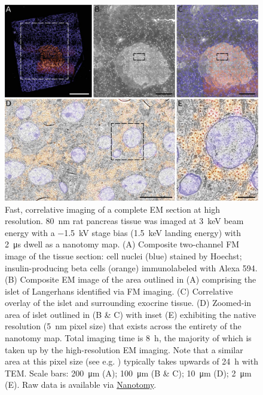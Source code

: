 \begin{figure}[!tb]
    \centering
    \includegraphics[width=\linewidth]{chapter-2/figures_JPEG_HQ/fig2-7_rat.jpg}
    \caption{Fast, correlative imaging of a complete EM section at high resolution. \SI{80}{\nano\meter} rat pancreas tissue was imaged at \SI{3}{\kilo\electronvolt} beam energy with a \SI{-1.5}{\kilo\volt} stage bias (\SI{1.5}{\kilo\electronvolt} landing energy) with \SI{2}{\micro\second} dwell as a nanotomy map. (A) Composite two-channel FM image of the tissue section: cell nuclei (blue) stained by Hoechst; insulin-producing beta cells (orange) immunolabeled with Alexa 594. (B) Composite EM image of the area outlined in (A) comprising the islet of Langerhans identified via FM imaging. (C) Correlative overlay of the islet and surrounding exocrine tissue. (D) Zoomed-in area of islet outlined in (B \& C) with inset (E) exhibiting the native resolution (\SI{5}{\nano\meter} pixel size) that exists across the entirety of the nanotomy map. Total imaging time is \SI{8}{\hour}, the majority of which is taken up by the high-resolution EM imaging. Note that a similar area at this pixel size (see e.g. \textcite{ravelli2013destruction}) typically takes upwards of \SI{24}{\hour} with TEM. Scale bars: \SI{200}{\micro\meter} (A); \SI{100}{\micro\meter} (B \& C); \SI{10}{\micro\meter} (D); \SI{2}{\micro\meter} (E). Raw data is available via \href{www.nanotomy.org}{Nanotomy}.}
    \label{fig:2.7_rat}
\end{figure}


